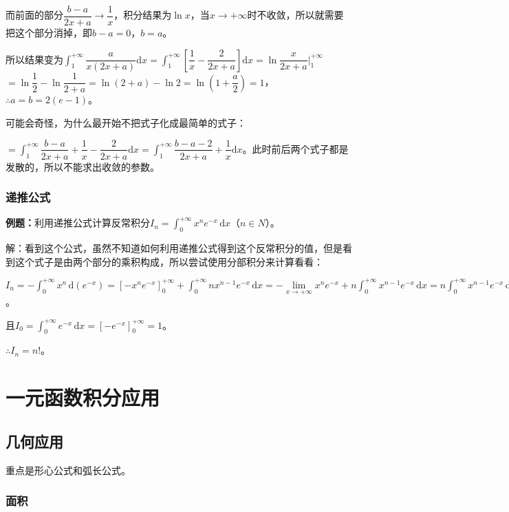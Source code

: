 \documentclass[UTF8, 12pt]{ctexart}
\begin{document}
而前面的部分$\dfrac{b-a}{2x+a}\to\dfrac{1}{x}$，积分结果为$\ln x$，当$x\to+\infty$时不收敛，所以就需要把这个部分消掉，即$b-a=0$，$b=a$。

所以结果变为$\displaystyle{\int_1^{+\infty}\dfrac{a}{x(2x+a)}\textrm{d}x=\int_1^{+\infty}\left[\dfrac{1}{x}-\dfrac{2}{2x+a}\right]\textrm{d}x}=\ln\dfrac{x}{2x+a}\bigg\vert_1^{+\infty}$\\$=\ln\dfrac{1}{2}-\ln\dfrac{1}{2+a}=\ln(2+a)-\ln2=\ln\left(1+\dfrac{a}{2}\right)=1$，$\therefore a=b=2(e-1)$。

可能会奇怪，为什么最开始不把式子化成最简单的式子：

$=\displaystyle{\int_1^{+\infty}\dfrac{b-a}{2x+a}+\dfrac{1}{x}-\dfrac{2}{2x+a}\textrm{d}x=\int_1^{+\infty}\dfrac{b-a-2}{2x+a}+\dfrac{1}{x}\textrm{d}x}$。此时前后两个式子都是发散的，所以不能求出收敛的参数。

\subsubsection{递推公式}

\textbf{例题：}利用递推公式计算反常积分$I_n=\int_0^{+\infty}x^ne^{-x}\,\textrm{d}x$（$n\in N$）。

解：看到这个公式，虽然不知道如何利用递推公式得到这个反常积分的值，但是看到这个式子是由两个部分的乘积构成，所以尝试使用分部积分来计算看看：

$I_n=-\int_0^{+\infty}x^n\,\textrm{d}(e^{-x})=[-x^ne^{-x}]_0^{+\infty}+\int_0^{+\infty}nx^{n-1}e^{-x}\,\textrm{d}x=-\lim\limits_{x\to+\infty}x^ne^{-x}+n\int_0^{+\infty}x^{n-1}e^{-x}\,\textrm{d}x=n\int_0^{+\infty}x^{n-1}e^{-x}\,\textrm{d}x=nI_{n-1}$。

且$I_0=\int_0^{+\infty}e^{-x}\,\textrm{d}x=[-e^{-x}]_0^{+\infty}=1$。

$\therefore I_n=n!$。

\section{一元函数积分应用}

\subsection{几何应用}

重点是形心公式和弧长公式。

\subsubsection{面积}
\end{document}
